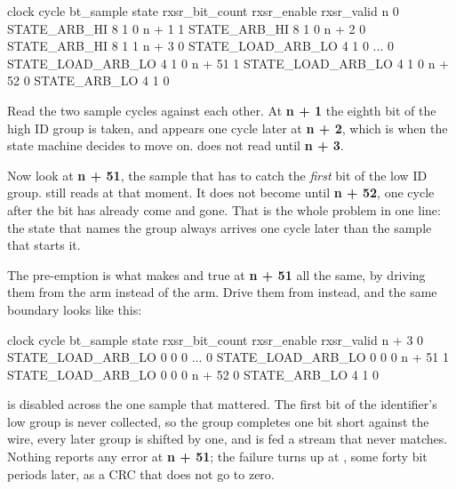 \begin{textdrawing}
clock cycle    bt_sample             state  rxsr_bit_count  rxsr_enable  rxsr_valid
n                      0         STATE_ARB_HI               8            1           0
n + 1                  1         STATE_ARB_HI               8            1           0
n + 2                  0         STATE_ARB_HI               8            1           1
n + 3                  0    STATE_LOAD_ARB_LO               4            1           0
...                    0    STATE_LOAD_ARB_LO               4            1           0
n + 51                 1    STATE_LOAD_ARB_LO               4            1           0
n + 52                 0         STATE_ARB_LO               4            1           0
\end{textdrawing}

Read the two sample cycles against each other. At \textbf{n + 1} the eighth bit of the high ID group
is taken, and  appears one cycle later at \textbf{n + 2}, which is when the state
machine decides to move on.  does not read  until \textbf{n + 3}.

Now look at \textbf{n + 51}, the sample that has to catch the \emph{first} bit of the low ID group.
 still reads  at that moment. It does not become
 until \textbf{n + 52}, one cycle after the bit has already come and gone. That is
the whole problem in one line: the state that names the group always arrives one cycle later than the
sample that starts it.

The pre-emption is what makes  and  true at
\textbf{n + 51} all the same, by driving them from the  arm instead of the
 arm. Drive them from  instead, and the same boundary looks like
this:

\begin{textdrawing}
clock cycle    bt_sample             state  rxsr_bit_count  rxsr_enable  rxsr_valid
n + 3                  0    STATE_LOAD_ARB_LO               0            0           0
...                    0    STATE_LOAD_ARB_LO               0            0           0
n + 51                 1    STATE_LOAD_ARB_LO               0            0           0
n + 52                 0         STATE_ARB_LO               4            1           0
\end{textdrawing}

 is disabled across the one sample that mattered. The first bit of the
identifier's low group is never collected, so the group completes one bit short against the wire,
every later group is shifted by one, and  is fed a stream that never matches. Nothing
reports any error at \textbf{n + 51}; the failure turns up at , some forty bit
periods later, as a CRC that does not go to zero.

